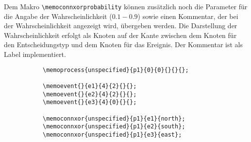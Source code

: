 \documentclass[12pt, a4paper]{article}
\begin{document}
\noindent Dem Makro \lstinline|\memoconnxorprobability| können zusätzlich noch die Parameter für die Angabe der Wahrscheinlichkeit ($0.1 - 0.9$) sowie einen Kommentar, der bei der Wahrscheinlichkeit angezeigt wird, übergeben werden. Die Darstellung der Wahrscheinlichkeit erfolgt als Knoten auf der Kante zwischen dem Knoten für den Entscheidungstyp und dem Knoten für das Ereignis. Der Kommentar ist als Label implementiert.
\begin{figure}[htbp]
    \centering
    \caption[Beispiel: Produktion eines alternativen Ereignisses ohne Wahrscheinlichkeit.]{Beispiel: Produktion eines alternativen Ereignisses ohne Wahrscheinlichkeit.}
    \begin{subfigure}{0.4\textwidth}
        \centering
    \end{subfigure}
    \begin{subfigure}{0.6\textwidth}
        \centering
        \begin{lstlisting}
\memoprocess{unspecified}{p1}{0}{0}{}{}{};
                 
\memoevent{}{e1}{4}{2}{}{};       
\memoevent{}{e2}{4}{2}{}{};
\memoevent{}{e3}{4}{0}{}{}; 
            
\memoconnxor{unspecified}{p1}{e1}{north};
\memoconnxor{unspecified}{p1}{e2}{south};
\memoconnxor{unspecified}{p1}{e3}{east};            
        \end{lstlisting}
    \end{subfigure}
    \label{fig:EntscheidungOhne}
\end{figure}

\noindent\DescribeMacro{\memoiterationuntil}\\\newline
\DescribeMacro{\memoiterationloop}\\\medskip
\end{document}
